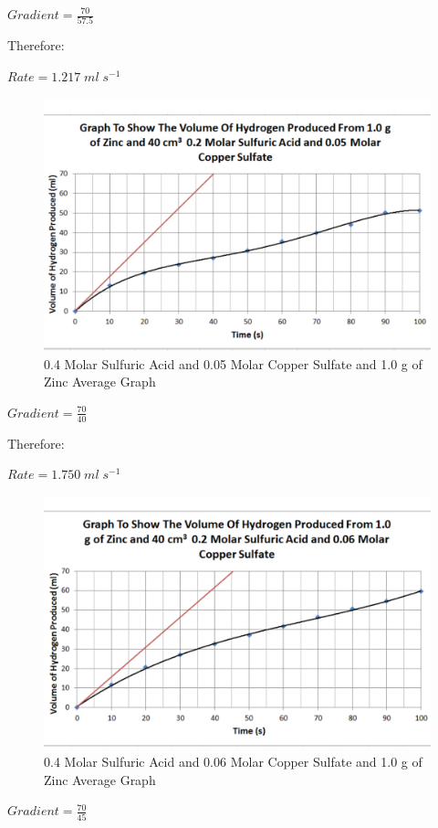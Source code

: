 $Gradient = \frac{70}{57.5}$

Therefore:

$Rate = 1.217 \; ml \; s^{-1}$

\begin{figure}[H]
    \includegraphics[width=\textwidth]{./Analysis/Images/3VaryCopperSulfate/005Molar.pdf}
    \caption{0.4 Molar Sulfuric Acid and 0.05 Molar Copper Sulfate and 1.0 g of Zinc Average Graph} \label{fig:005VaryCopperSulfate}
\end{figure}

$Gradient = \frac{70}{40}$

Therefore:

$Rate = 1.750 \; ml \; s^{-1}$

\begin{figure}[H]
    \includegraphics[width=\textwidth]{./Analysis/Images/3VaryCopperSulfate/006Molar.pdf}
    \caption{0.4 Molar Sulfuric Acid and 0.06 Molar Copper Sulfate and 1.0 g of Zinc Average Graph} \label{fig:006VaryCopperSulfate}
\end{figure}
$Gradient = \frac{70}{45}$

